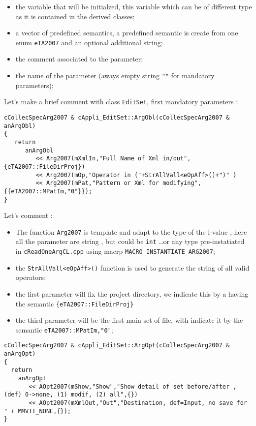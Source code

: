 \documentclass[a4paper]{book}
\begin{document}
{\begin{itemize}
   \item  the variable that will be initialzed, this variable which can be of different type
          as it is contained in the derived classes;

   \item  a vector of predefined semantics, a predefined semantic is create from one
          enum {\tt eTA2007} and an optional additional string;
   \item  the comment associated to the parameter;
   \item  the name of the parameter (aways empty string {\tt ""} for mandatory parameters);
\end{itemize}

Let's make a brief comment with class {\tt EditSet}, first mandatory parameters :

{\small
\begin{verbatim}
cCollecSpecArg2007 & cAppli_EditSet::ArgObl(cCollecSpecArg2007 & anArgObl)
{
   return
      anArgObl
         << Arg2007(mXmlIn,"Full Name of Xml in/out",{eTA2007::FileDirProj})
         << Arg2007(mOp,"Operator in ("+StrAllVall<eOpAff>()+")" )
         << Arg2007(mPat,"Pattern or Xml for modifying",{{eTA2007::MPatIm,"0"}});
}
\end{verbatim}
}

Let's comment :

\begin{itemize}
   \item The function {\tt Arg2007} is template and adapt to the type of the
         l-value , here all the parameter are string , but could be {\tt int} \dots or
         any type pre-instatiated in {\tt cReadOneArgCL.cpp} using macrp {\tt MACRO\_INSTANTIATE\_ARG2007};

   \item the {\tt StrAllVall<eOpAff>()} function is used to generate the string of all valid operators;

   \item the first parameter will fix the project directory, we indicate this by a having
         the semantic {\tt  \{eTA2007::FileDirProj\}}

   \item the third parameter will be the first main set of file, with indicate it by
         the semantic {\tt {eTA2007::MPatIm,"0"}};
\end{itemize}

{\small
\begin{verbatim}
cCollecSpecArg2007 & cAppli_EditSet::ArgOpt(cCollecSpecArg2007 & anArgOpt)
{
  return
    anArgOpt
       << AOpt2007(mShow,"Show","Show detail of set before/after , (def) 0->none, (1) modif, (2) all",{})
       << AOpt2007(mXmlOut,"Out","Destination, def=Input, no save for " + MMVII_NONE,{});
}
\end{verbatim}
}

}
\end{document}
